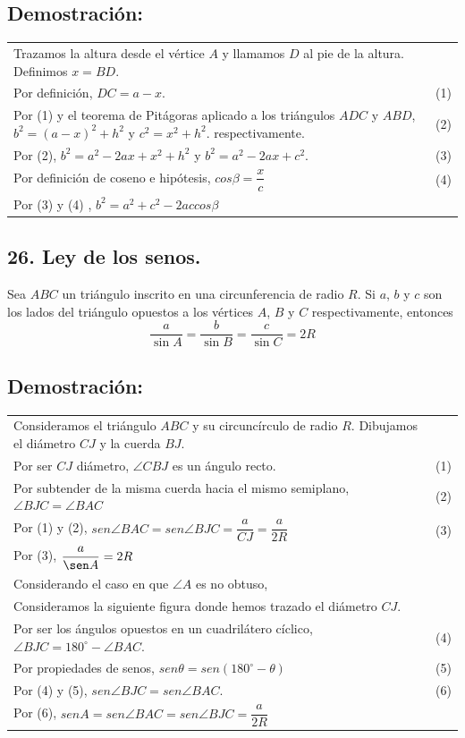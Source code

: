 \documentclass[12pt,a4paper]{article}
\begin{document}
\subsection*{Demostración:}
\begin{tabular}{p{15.9 cm} p{1cm}}
Trazamos la altura desde el vértice $A$ y llamamos $D$ al pie de la altura. Definimos $x=BD$.
\\Por definición, $DC=a-x.$ &(1)
\\Por (1) y el teorema de Pitágoras aplicado a los triángulos $ADC$ y $ABD$, $b^2=(a-x)^2 + h^2$ y $c^2=x^2 +h^2$.  respectivamente. & \medskip (2)
\\Por (2), $b^2=a^2-2ax+x^2+h^2$ y $b^2=a^2- 2ax+c^2$. &(3)
\\Por definición de coseno e hipótesis, $cos\beta = \dfrac{x}{c}$  &(4)
\\Por (3) y (4) , $b^2= a^2 +c^2-2ac cos \beta$
\end{tabular}
\subsection*{26. Ley de los senos.}
Sea $ABC$ un triángulo inscrito en una circunferencia de radio $R$. Si $a$, $b$ y $c$ son los lados del triángulo opuestos a los vértices $A$, $B$ y $C$ respectivamente, entonces$$ \dfrac{a}{\sin A} = \dfrac{b}{\sin B}= \dfrac{c}{\sin C}= 2R$$
\subsection*{Demostración:}
\begin{tabular}{p{15.9 cm} p{1cm}}
Consideramos el triángulo $ABC$ y su circuncírculo de radio $R$. Dibujamos el diámetro $CJ$ y la cuerda $BJ$.
\\Por ser $CJ$ diámetro, $\angle CBJ$ es un ángulo recto. &(1)
\\Por subtender de la misma cuerda hacia el mismo  semiplano, $ \angle BJC= \angle BAC$ &(2)
\\Por (1) y (2), $sen \angle BAC = sen \angle BJC = \dfrac{a}{CJ}=\dfrac{a}{2R}$ &(3)
\\ Por (3), $\dfrac{a}{\sen A} = 2R$
\\Considerando el caso en que $\angle A$ es no obtuso, \\Consideramos la siguiente figura donde hemos trazado el diámetro $CJ$.
\\Por ser los ángulos opuestos en un cuadrilátero cíclico, $\angle BJC = 180^{\circ} - \angle BAC$. &(4)
\\Por propiedades de senos, $sen \theta = sen (180^{\circ}-\theta)$ &(5)
\\Por (4) y (5), $sen \angle BJC = sen \angle BAC$. &(6)
\\Por (6), $sen A= sen \angle BAC = sen \angle BJC = \dfrac{a}{2R}$
\end{tabular}
\end{document}
